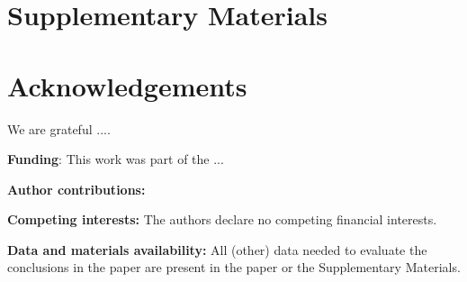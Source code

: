 \documentclass[12pt]{article}
\begin{document}


\section*{Supplementary Materials}

\renewcommand\refname{References and Notes}



\newpage
\section*{Acknowledgements}

We are grateful ....

\noindent
\textbf{Funding}: This work was part of the ...

\noindent
\textbf{Author contributions:} 

\noindent
\textbf{Competing interests:} The authors declare no competing financial interests.

\noindent
\textbf{Data and materials availability:} All (other) data needed to
evaluate the conclusions in the paper are present in the paper or the
Supplementary Materials.

% 
\end{document}

